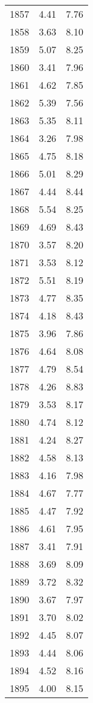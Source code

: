 \begin{tabular}{lrr}
1857 &    4.41 &    7.76 \\
1858 &    3.63 &    8.10 \\
1859 &    5.07 &    8.25 \\
1860 &    3.41 &    7.96 \\
1861 &    4.62 &    7.85 \\
1862 &    5.39 &    7.56 \\
1863 &    5.35 &    8.11 \\
1864 &    3.26 &    7.98 \\
1865 &    4.75 &    8.18 \\
1866 &    5.01 &    8.29 \\
1867 &    4.44 &    8.44 \\
1868 &    5.54 &    8.25 \\
1869 &    4.69 &    8.43 \\
1870 &    3.57 &    8.20 \\
1871 &    3.53 &    8.12 \\
1872 &    5.51 &    8.19 \\
1873 &    4.77 &    8.35 \\
1874 &    4.18 &    8.43 \\
1875 &    3.96 &    7.86 \\
1876 &    4.64 &    8.08 \\
1877 &    4.79 &    8.54 \\
1878 &    4.26 &    8.83 \\
1879 &    3.53 &    8.17 \\
1880 &    4.74 &    8.12 \\
1881 &    4.24 &    8.27 \\
1882 &    4.58 &    8.13 \\
1883 &    4.16 &    7.98 \\
1884 &    4.67 &    7.77 \\
1885 &    4.47 &    7.92 \\
1886 &    4.61 &    7.95 \\
1887 &    3.41 &    7.91 \\
1888 &    3.69 &    8.09 \\
1889 &    3.72 &    8.32 \\
1890 &    3.67 &    7.97 \\
1891 &    3.70 &    8.02 \\
1892 &    4.45 &    8.07 \\
1893 &    4.44 &    8.06 \\
1894 &    4.52 &    8.16 \\
1895 &    4.00 &    8.15 \\

\end{tabular}
